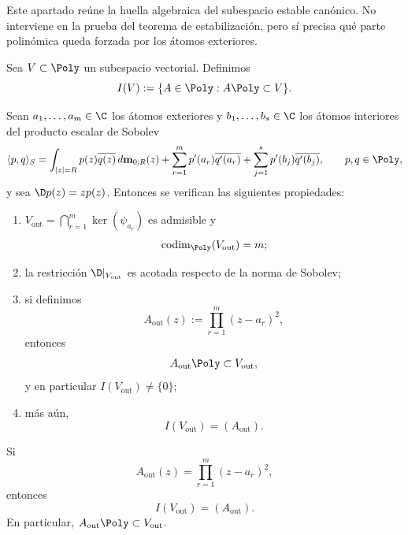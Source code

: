 Este apartado reúne la huella algebraica del subespacio estable canónico. No interviene en la prueba del teorema de estabilización, pero sí precisa qué parte polinómica queda forzada por los átomos exteriores.

\begin{defn}
Sea $V\subset\Poly$ un subespacio vectorial. Definimos
\[
I(V):=\{A\in\Poly:A\Poly\subset V\}.
\]
\end{defn}

\begin{thm}\label{thm:Vout_anulador}
Sean $a_1,\dots,a_m\in\C$ los átomos exteriores y $b_1,\dots,b_s\in\C$ los átomos interiores del producto escalar de Sobolev
\[
\langle p,q\rangle_S
=
\int_{|z|=R}p(z)\overline{q(z)}\,d\mathbf m_{0;R}(z)
+
\sum_{r=1}^{m} p'(a_r)\overline{q'(a_r)}
+
\sum_{j=1}^{s} p'(b_j)\overline{q'(b_j)},
\qquad p,q\in\Poly,
\]
y sea $\D p(z)=zp(z)$. Entonces se verifican las siguientes propiedades:
\begin{enumerate}
\item $V_{\mathrm{out}}=\bigcap_{r=1}^{m}\ker(\psi_{a_r})$ es admisible y
\[
\operatorname{codim}_{\Poly}(V_{\mathrm{out}})=m;
\]
\item la restricción $\D|_{V_{\mathrm{out}}}$ es acotada respecto de la norma de Sobolev;
\item si definimos
\[
A_{\mathrm{out}}(z):=\prod_{r=1}^{m}(z-a_r)^2,
\]
entonces
\[
A_{\mathrm{out}}\Poly\subset V_{\mathrm{out}},
\]
y en particular $I(V_{\mathrm{out}})\ne\{0\}$;
\item más aún,
\[
I(V_{\mathrm{out}})=(A_{\mathrm{out}}).
\]
\end{enumerate}
\end{thm}

\begin{lem}\label{lem:vout_anulador}
Si
\[
A_{\mathrm{out}}(z)=\prod_{r=1}^{m}(z-a_r)^2,
\]
entonces
\[
I(V_{\mathrm{out}})=(A_{\mathrm{out}}).
\]
En particular, $A_{\mathrm{out}}\Poly\subset V_{\mathrm{out}}$.
\end{lem}

